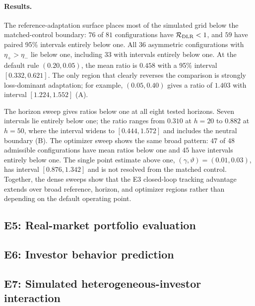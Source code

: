 \paragraph{Results.}
The reference-adaptation surface places most of the simulated grid below the matched-control boundary: $76$ of $81$ configurations have $\mathcal R_{\rm DLR}<1$, and $59$ have paired 95\% intervals entirely below one.  All $36$ asymmetric configurations with $\eta_+>\eta_-$ lie below one, including $33$ with intervals entirely below one.  At the default rule $(0.20,0.05)$, the mean ratio is $0.458$ with a 95\% interval $[0.332,0.621]$.  The only region that clearly reverses the comparison is strongly loss-dominant adaptation; for example, $(0.05,0.40)$ gives a ratio of $1.403$ with interval $[1.224,1.552]$ (A).

The horizon sweep gives ratios below one at all eight tested horizons.  Seven intervals lie entirely below one; the ratio ranges from $0.310$ at $h=20$ to $0.882$ at $h=50$, where the interval widens to $[0.444,1.572]$ and includes the neutral boundary (B).  The optimizer sweep shows the same broad pattern: $47$ of $48$ admissible configurations have mean ratios below one and $45$ have intervals entirely below one.  The single point estimate above one, $(\gamma,\vartheta)=(0.01,0.03)$, has interval $[0.876,1.342]$ and is not resolved from the matched control.  Together, the dense sweeps show that the E3 closed-loop tracking advantage extends over broad reference, horizon, and optimizer regions rather than depending on the default operating point.
\FloatBarrier

\subsection{E5: Real-market portfolio evaluation}\label{sec:e5}

\subsection{E6: Investor behavior prediction}\label{sec:e6}

\subsection{E7: Simulated heterogeneous-investor interaction}\label{sec:e7}
